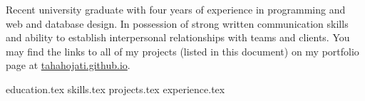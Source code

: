 \documentclass[11pt, a4paper]{awesome-cv}
\newcommand*{\sectiondir}{resume/}
\begin{document}
\makecvheader


Recent university graduate with four years of experience in programming and web and database design. In possession of strong written communication skills and ability to establish interpersonal relationships with teams and clients. You may find the links to all of my projects (listed in this document) on my portfolio page at \href{http://tahahojati.github.io}{tahahojati.github.io}.  %


{education.tex}
{skills.tex}
{projects.tex}
{experience.tex}
\end{document}
